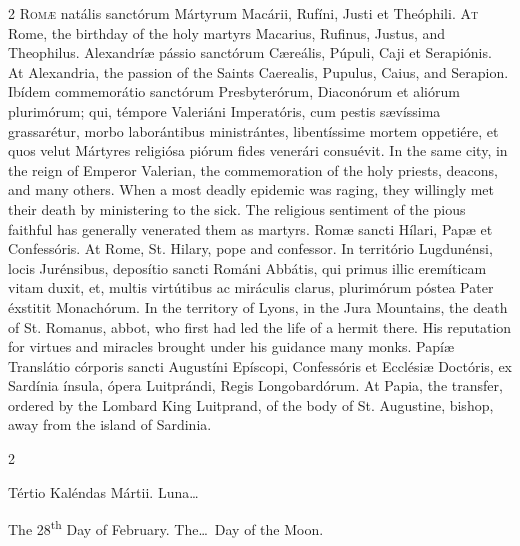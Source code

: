 \begin{paracol}{2}
\lettrine[lines=2]{R}{omæ} natális sanctórum Mártyrum Macárii, Rufíni, 
 Justi et Theóphili.
\switchcolumn
{}
\lettrine[lines=2]{A}{t} Rome, the birthday of the holy martyrs Macarius, Rufinus, Justus, and 
 Theophilus.
\switchcolumn*
{}
Alexandríæ pássio sanctórum Cæreális, Púpuli, 
 Caji et Serapiónis.
\switchcolumn
{}
At Alexandria, the passion of the Saints Caerealis, Pupulus, Caius, and 
 Serapion.
\switchcolumn*
{}
Ibídem commemorátio sanctórum Presbyterórum, Diaconórum et aliórum 
 plurimórum; qui, témpore Valeriáni Imperatóris, cum pestis sævíssima 
 grassarétur, morbo laborántibus ministrántes, libentíssime mortem oppetiére, 
 et quos velut Mártyres religiósa piórum fides venerári consuévit.
\switchcolumn
{}
In the same city, in the reign of Emperor Valerian, the commemoration of the 
 holy priests, deacons, and many others. When a most deadly epidemic 
 was raging, they willingly met their death by ministering to the sick. 
 The religious sentiment of the pious faithful has generally venerated them 
 as martyrs.
\switchcolumn*
{}
Romæ sancti Hílari, Papæ et Confessóris.
\switchcolumn
{}
At Rome, St. Hilary, pope and confessor.
\switchcolumn*
{}
In território Lugdunénsi, locis Jurénsibus, deposítio sancti Románi Abbátis, 
 qui primus illic eremíticam vitam duxit, et, multis virtútibus ac miráculis 
 clarus, plurimórum póstea Pater éxstitit Monachórum.
\switchcolumn
{}
In the territory of Lyons, in the Jura Mountains, the death of St. Romanus, 
 abbot, who first had led the life of a hermit there. His reputation 
 for virtues and miracles brought under his guidance many monks.
\switchcolumn*
{}
Papíæ Translátio córporis sancti Augustíni 
 Epíscopi, Confessóris et Ecclésiæ Doctóris, ex Sardínia ínsula, ópera 
 Luitprándi, Regis Longobardórum.
\switchcolumn
{}
At Papia, the transfer, ordered by the Lombard King Luitprand, of the body 
 of St. Augustine, bishop, away from the island of Sardinia.
\switchcolumn*
{}
\end{paracol}


\begin{paracol}{2}
\begin{center}{\color{gregoriocolor} Tértio Kaléndas Mártii. 
 Luna\dots\ }\end{center}
\switchcolumn
{}
\begin{center}{\color{gregoriocolor} The 28\textsuperscript{th} Day of February. The\dots\ Day of the Moon.}\end{center}
\end{paracol}

